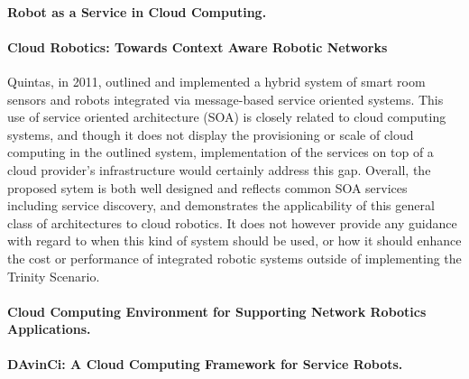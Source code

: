 \documentclass[10pt,letterpaper]{article}
\begin{document}
\paragraph{Robot as a Service in Cloud Computing.}

\cite{YiZhGa:10}

\paragraph{Cloud Robotics: Towards Context Aware Robotic Networks}
Quintas, in 2011, outlined and implemented a hybrid system of smart room sensors and robots integrated via message-based service oriented systems.  This use of service oriented architecture (SOA) is closely related to cloud computing systems, and though it does not display the provisioning or scale of cloud computing in the outlined system, implementation of the services on top of a cloud provider's infrastructure would certainly address this gap.  Overall, the proposed sytem is both well designed and reflects common SOA services including service discovery, and demonstrates the applicability of this general class of architectures to cloud robotics.  It does not however provide any guidance with regard to when this kind of system should be used, or how it should enhance the cost or performance of integrated robotic systems outside of implementing the Trinity Scenario.

\cite{QuMeDi:11}

\paragraph{Cloud Computing Environment for Supporting Network Robotics Applications.}

\cite{AgOlFePa:11}

\paragraph{DAvinCi: A Cloud Computing Framework for Service Robots.}

\cite{ArEnLiWu:10}



\end{document}

